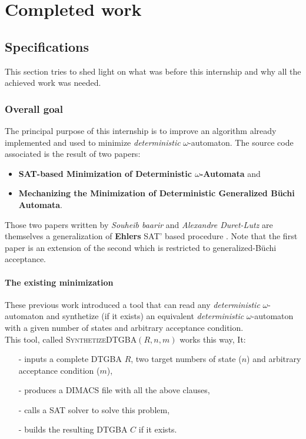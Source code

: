 \chapter{Completed work}


\section{Specifications}
This section tries to shed light on what was before this internship and why all the achieved work was
needed.

\subsection{Overall goal}
The principal purpose of this internship is to improve an algorithm already implemented and used to
minimize \textit{deterministic} $\omega$-automaton. The source code associated is the result of two papers:
\begin{itemize}
 \item \textbf{SAT-based Minimization of Deterministic $\omega$-Automata}\cite{15} and
 \item \textbf{Mechanizing the Minimization of Deterministic Generalized Büchi Automata}\cite{14}.
\end{itemize}

Those two papers written by \textit{Souheib baarir} and \textit{Alexandre Duret-Lutz} are themselves a
generalization of \textbf{Ehlers} SAT' based procedure \cite{17}. Note that the first paper\cite{15} is an
extension of the second\cite{14} which is restricted to generalized-Büchi acceptance.

\subsubsection{The existing minimization}
These previous work introduced a tool that can read any \textit{deterministic} $\omega$-automaton and
synthetize (if it exists) an equivalent \textit{deterministic} $\omega$-automaton with a given number
of states and arbitrary acceptance condition.\\

\noindent This tool, called \textsc{Synthetize}DTGBA$(R,n,m)$ works this way, It:
\begin{itemize}
 \item[-] inputs a complete DTGBA $R$, two target numbers of state ($n$) and arbitrary acceptance condition
          ($m$),
 \item[-] produces a DIMACS file \cite{18} with all the above clauses,
 \item[-] calls a SAT solver to solve this problem,
 \item[-] builds the resulting DTGBA $C$ if it exists.
\end{itemize}

